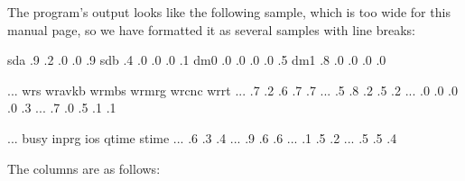 \documentclass[letterpaper,10pt,english]{sphinxmanual}
\begin{document}
The program’s output looks like the following sample, which is too wide for this
manual page, so we have formatted it as several samples with line breaks:

\begin{sphinxVerbatim}[commandchars=\\\{\}]
 sda     .9     .2     .0     \PYGZpc{}    .0    .9
 sdb     .4     .0     .0     \PYGZpc{}    .0    .1
 dm\PYGZhy{}0    .0     .0     .0     \PYGZpc{}    .0    .5
 dm\PYGZhy{}1    .8     .0     .0     \PYGZpc{}    .0    .0

    ...    wr\PYGZus{}s wr\PYGZus{}avkb wr\PYGZus{}mb\PYGZus{}s wr\PYGZus{}mrg wr\PYGZus{}cnc   wr\PYGZus{}rt
    ...    .7     .2     .6    \PYGZpc{}    .7    .7
    ...    .5    .8     .2    \PYGZpc{}    .5     .2
    ...     .0     .0     .0     \PYGZpc{}    .0     .3
    ...   .7     .0     .5     \PYGZpc{}    .1    .1

    ...              busy in\PYGZus{}prg    io\PYGZus{}s  qtime stime
    ...                \PYGZpc{}         .6   .3   .4
    ...                \PYGZpc{}          .9    .6   .6
    ...                \PYGZpc{}           .1    .5   .2
    ...                \PYGZpc{}         .5   .5   .4
\end{sphinxVerbatim}

The columns are as follows:
\end{document}
